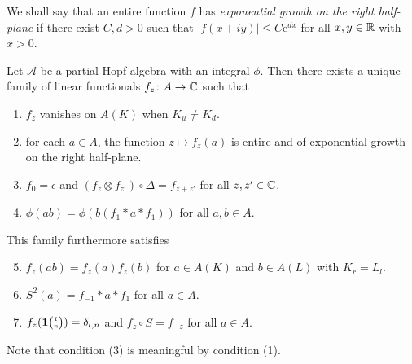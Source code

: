We shall say that an entire function $f$ has \emph{exponential growth
  on the right half-plane} if there exist $C,d>0$ such that $|f(x+iy)|\leq
C\mathrm{e}^{dx}$  for all $x,y\in \mathbb{R}$ with $x>0$. 

\begin{Theorem} \label{thm:rep-characters} Let $\mathscr{A}$ be a
  partial Hopf algebra with an integral $\phi$.  Then there exists a unique
  family of linear functionals $f_{z} \colon A\to \mathbb{C}$ such that
\begin{enumerate}
  \item $f_z$ vanishes on $A(K)$ when $K_u\neq K_d$.
  \item for each $a\in A$, the function $z\mapsto f_{z}(a)$ is entire
    and of exponential growth on the right half-plane.
  \item $f_{0} = \epsilon$ and $(f_{z} \otimes f_{z'}) \circ 
    \Delta= f_{z+z'}$ for all $z,z' \in \mathbb{C}$.
  \item $\phi(ab)=\phi(b(f_{1} \ast a \ast f_{1}))$ for all $a,b\in A$.
  \end{enumerate}
  This family furthermore satisfies
  \begin{enumerate}\setcounter{enumi}{4}
  \item $f_z(ab) = f_z(a)f_z(b)$ for $a\in A(K)$ and $b\in A(L)$ with $K_r = L_l$. 
  \item $S^{2}(a)=f_{-1} \ast a \ast f_{1}$ for all $a\in A$.
  \item $f_{z}(\mathbf{1}{\tiny {\begin{pmatrix} l\\n\end{pmatrix}}})=\delta_{l,n}$ and $f_{z} \circ S = f_{-z}$ for all $a\in A$.
\end{enumerate}
\end{Theorem}


Note that condition (3) is meaningful by condition (1).

